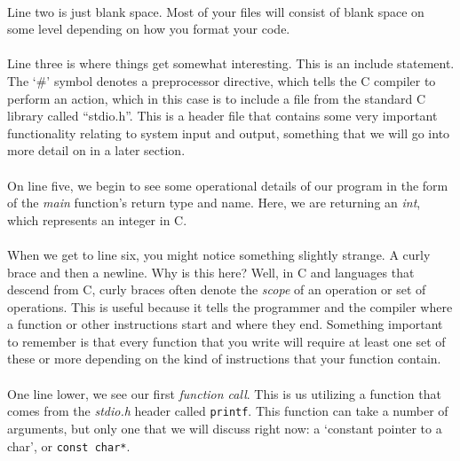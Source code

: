 \paragraph{}
   Line two is just blank space. Most of your files will consist of blank space on some level depending on how you format your code.

\paragraph{}
   Line three is where things get somewhat interesting. This is an include statement. The `\#' symbol denotes a preprocessor directive, which tells
   the C compiler to perform an action, which in this case is to include a file from the standard C library called ``stdio.h''. This is a header file
   that contains some very important functionality relating to system input and output, something that we will go into more detail on in a later
   section.

\paragraph{}
   On line five, we begin to see some operational details of our program in the form of the \textit{main} function's return type and name. Here, we
   are returning an \textit{int}, which represents an integer in C.

\paragraph{}
   When we get to line six, you might notice something slightly strange. A curly brace and then a newline. Why is this here? Well, in C and languages
   that descend from C, curly braces often denote the \textit{scope} of an operation or set of operations. This is useful because it tells the
   programmer and the compiler where a function or other instructions start and where they end. Something important to remember is that every function
   that you write will require at least one set of these or more depending on the kind of instructions that your function contain.

\paragraph{}
   One line lower, we see our first \textit{function call}. This is us utilizing a function that comes from the \textit{stdio.h} header called \verb;printf;.
   This function can take a number of arguments, but only one that we will discuss right now: a `constant pointer to a char', or \verb;const char*;.

